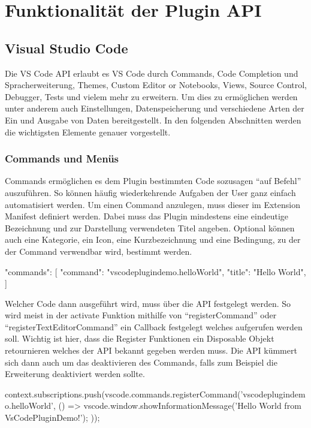 \section{Funktionalität der Plugin API}
\label{sec:FunktionalitätDerPluginAPI}

\subsection{Visual Studio Code}

Die VS Code API erlaubt es VS Code durch Commands, Code Completion und Spracherweiterung, 
Themes, Custom Editor or Notebooks, Views, Source Control, Debugger, Tests und vielem mehr zu
erweitern. Um dies zu ermöglichen werden unter anderem auch Einstellungen, Datenspeicherung
und verschiedene Arten der Ein und Ausgabe von Daten bereitgestellt. In den folgenden Abschnitten
werden die wichtigsten Elemente genauer vorgestellt.

\subsubsection{Commands und Menüs}
  Commands ermöglichen es dem Plugin bestimmten Code sozusagen \enquote{auf Befehl} auszuführen.
  So können häufig wiederkehrende Aufgaben der User ganz einfach automatisiert werden.
  Um einen Command anzulegen, muss dieser im Extension Manifest definiert werden. Dabei muss
  das Plugin mindestens eine eindeutige Bezeichnung und zur Darstellung verwendeten Titel angeben.
  Optional können auch eine Kategorie, ein Icon, eine Kurzbezeichnung und eine Bedingung, 
  zu der der Command verwendbar wird, bestimmt werden.
  \begin{JsCode}
    "commands": [
      {
        "command": "vscodeplugindemo.helloWorld",
        "title": "Hello World",
      }
    ]
  \end{JsCode}

  Welcher Code dann ausgeführt wird, muss über die API festgelegt werden. So wird meist
  in der activate Funktion mithilfe von \enquote{registerCommand} oder \enquote{registerTextEditorCommand}
  ein Callback festgelegt welches aufgerufen werden soll. Wichtig ist hier, dass
  die Register Funktionen ein Disposable Objekt retournieren welches der API bekannt gegeben werden
  muss. Die API kümmert sich dann auch um das deaktivieren des Commands, falls zum Beispiel
  die Erweiterung deaktiviert werden sollte.
  \begin{JsCode}
    context.subscriptions.push(vscode.commands.registerCommand('vscodeplugindemo.helloWorld', () => {
      vscode.window.showInformationMessage('Hello World from VsCodePluginDemo!');
    }));
  \end{JsCode}

